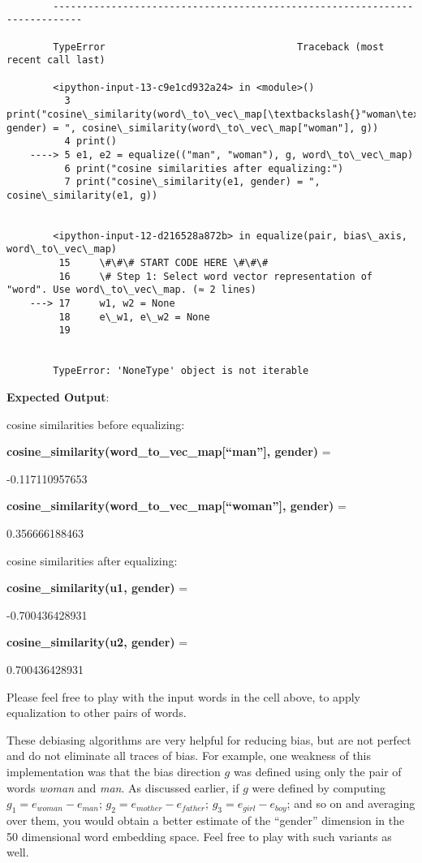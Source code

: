 \documentclass[11pt]{article}
\begin{document}
    \begin{Verbatim}[commandchars=\\\{\}]

        ---------------------------------------------------------------------------

        TypeError                                 Traceback (most recent call last)

        <ipython-input-13-c9e1cd932a24> in <module>()
          3 print("cosine\_similarity(word\_to\_vec\_map[\textbackslash{}"woman\textbackslash{}"], gender) = ", cosine\_similarity(word\_to\_vec\_map["woman"], g))
          4 print()
    ----> 5 e1, e2 = equalize(("man", "woman"), g, word\_to\_vec\_map)
          6 print("cosine similarities after equalizing:")
          7 print("cosine\_similarity(e1, gender) = ", cosine\_similarity(e1, g))


        <ipython-input-12-d216528a872b> in equalize(pair, bias\_axis, word\_to\_vec\_map)
         15     \#\#\# START CODE HERE \#\#\#
         16     \# Step 1: Select word vector representation of "word". Use word\_to\_vec\_map. (≈ 2 lines)
    ---> 17     w1, w2 = None
         18     e\_w1, e\_w2 = None
         19 


        TypeError: 'NoneType' object is not iterable

    \end{Verbatim}

    \textbf{Expected Output}:

cosine similarities before equalizing:

\textbf{cosine\_similarity(word\_to\_vec\_map{[}``man''{]}, gender)} =

-0.117110957653

\textbf{cosine\_similarity(word\_to\_vec\_map{[}``woman''{]}, gender)} =

0.356666188463

cosine similarities after equalizing:

\textbf{cosine\_similarity(u1, gender)} =

-0.700436428931

\textbf{cosine\_similarity(u2, gender)} =

0.700436428931

    Please feel free to play with the input words in the cell above, to
apply equalization to other pairs of words.

These debiasing algorithms are very helpful for reducing bias, but are
not perfect and do not eliminate all traces of bias. For example, one
weakness of this implementation was that the bias direction $g$ was
defined using only the pair of words \emph{woman} and \emph{man}. As
discussed earlier, if $g$ were defined by computing
$g_1 = e_{woman} - e_{man}$; $g_2 = e_{mother} - e_{father}$;
$g_3 = e_{girl} - e_{boy}$; and so on and averaging over them, you would
obtain a better estimate of the ``gender'' dimension in the 50
dimensional word embedding space. Feel free to play with such variants
as well.
\end{document}
